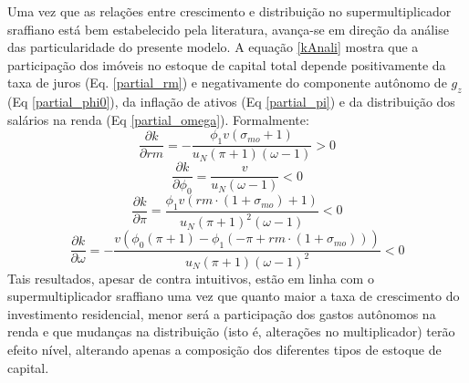 Uma vez que as relações entre crescimento e distribuição no supermultiplicador sraffiano está bem estabelecido pela literatura, avança-se em direção da análise das particularidade do presente modelo.
A equação \ref{kAnali} mostra que a participação dos imóveis no estoque de capital total depende 
positivamente da taxa de juros (Eq. \ref{partial_rm}) e 
negativamente do componente autônomo de $g_z$ (Eq \ref{partial_phi0}), da inflação de ativos (Eq \ref{partial_pi}) e da distribuição dos salários na renda (Eq \ref{partial_omega}). Formalmente:
\begin{equation}
\label{partial_rm}
\frac{\partial k}{\partial rm} = - \frac{\phi_{1} v \left(\sigma_{mo} + 1\right)}{u_N \left(\pi + 1\right) \left(\omega - 1\right)} > 0
\end{equation}
\begin{equation}
\label{partial_phi0}
\frac{\partial k}{\partial \phi_0} = \frac{v}{u_N \left(\omega - 1\right)} < 0
\end{equation}
\begin{equation}
\label{partial_pi}
\frac{\partial k}{\partial \pi} = \frac{\phi_{1} v \left(rm\cdot(1+\sigma_{mo}) + 1\right)}{u_N \left(\pi + 1\right)^{2} \left(\omega - 1\right)} < 0
\end{equation}
\begin{equation}
\label{partial_omega}
\frac{\partial k}{\partial \omega} = - \frac{v \left(\phi_{0} \left(\pi + 1\right) - \phi_{1} \left(- \pi + rm\cdot(1 + \sigma_{mo})\right)\right)}{u_N \left(\pi + 1\right) \left(\omega - 1\right)^{2}} < 0
\end{equation}
Tais resultados, apesar de contra intuitivos, estão em linha com o supermultiplicador sraffiano uma vez que quanto maior a taxa de crescimento do investimento residencial, menor será a participação dos gastos autônomos na renda e que mudanças na distribuição (isto é, alterações no multiplicador) terão efeito nível, alterando apenas a composição dos diferentes tipos de estoque de capital. 



\begin{comment}
Etapas da solução analítica
$$
u_t = - \frac{k v \left(\phi_{0} - \phi_{1} \left(-1 + \frac{rm\cdot(1+\sigma_{mo})}{\pi + 1}\right)\right)}{\left(1 - k\right) \left(\omega - 1 + \frac{v \left(\phi_{0} - \phi_{1} \left(-1 + \frac{rm\cdot(1+\sigma_{mo})}{\pi + 1}\right)\right)}{u_N}\right)}
$$
$$
\frac{k}{1 - k} = \frac{u_N \left(- \omega \left(\pi + 1\right) + \pi + 1\right) - v \left(\phi_{0} \left(\pi + 1\right) - \phi_{1} \left(- \pi + rm + \sigma_{mo}\right)\right)}{v \left(\phi_{0} \left(\pi + 1\right) - \phi_{1} \left(- \pi + rm + \sigma_{mo}\right)\right)}
$$
Por fim, resolvendo para $k$:
$$
k = \frac{u_N \left(- \omega \left(\pi + 1\right) + \pi + 1\right) - v \left(\phi_{0} \left(\pi + 1\right) - \phi_{1} \left(- \pi + rm + \sigma_{mo}\right)\right)(1-R)}{u_N \left(- \omega \left(\pi + 1\right) + \pi + 1\right)}
$$
\end{comment}